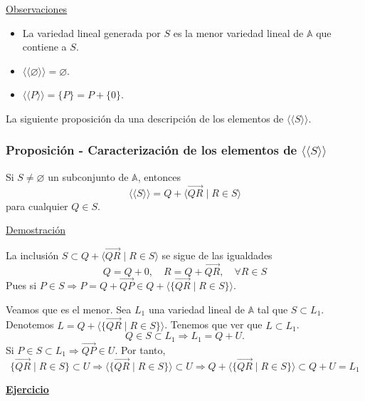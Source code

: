 \documentclass[12pt, a4paper, ones, notitlepage, openany,titlepage]{article}
\newcommand{\demostracion}{\noindent\underline{Demostración}}
\newcommand{\ejercicio}{\noindent\underline{\textbf{Ejercicio}}}
\begin{document}
\noindent\underline{Observaciones}
\begin{itemize}
\item La variedad lineal generada por $S$ es la menor variedad lineal de $\mathbb{A}$ que contiene a $S$.
\item $\langle\langle \varnothing \rangle\rangle = \varnothing$.
\item $\langle\langle P \rangle\rangle = \{P\} = P + \{0\}$.
\end{itemize}
La siguiente proposición da una descripción de los elementos de $\langle\langle S\rangle\rangle$.

\subsubsection{Proposición - Caracterización de los elementos de $\langle\langle S\rangle\rangle$}
\noindent Si $S \neq \varnothing$ un subconjunto de $\mathbb{A}$, entonces
$$
\langle\langle S\rangle\rangle=Q+\langle\overrightarrow{Q R} \mid R \in S\rangle
$$
\noindent para cualquier $Q \in S$.

\demostracion

\noindent La inclusión $S \subset Q+\langle\overrightarrow{Q R} \mid R \in S\rangle$ se sigue de las igualdades
$$
Q=Q+0, \quad R=Q+\overrightarrow{Q R}, \quad \forall R \in S
$$
Pues si $P \in S \Longrightarrow P = Q + \overrightarrow{QP} \in Q + \langle \{\overrightarrow{QR} \mid R \in S\} \rangle$.

Veamos que es el menor. Sea $L_1$ una variedad lineal de $\mathbb{A}$ tal que $S \subset L_1$. Denotemos $L = Q + \langle\{\overrightarrow{QR} \mid R \in S\}\rangle$. Tenemos que ver que $L \subset L_1$.
$$
Q \in S \subset L_1 \Longrightarrow L_1 = Q + U.
$$
Si $P \in S \subset L_1 \Longrightarrow \overrightarrow{QP} \in U$. Por tanto,
$$
\{\overrightarrow{QR} \mid R \in S\} \subset U \Longrightarrow \langle \{\overrightarrow{QR} \mid R \in S\} \rangle \subset U \Longrightarrow Q + \langle\{\overrightarrow{QR} \mid R \in S\}\rangle \subset Q + U = L_1
$$

\ejercicio
	
\end{document}

